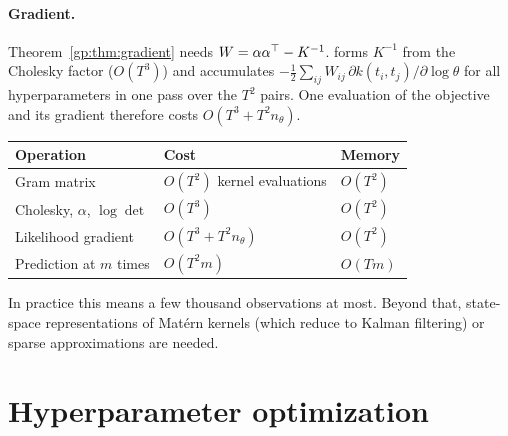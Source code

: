 \paragraph{Gradient.} Theorem~\ref{gp:thm:gradient} needs $W=\alpha\alpha^\top-K^{-1}$.
 forms $K^{-1}$ from the Cholesky factor ($O(T^3)$) and accumulates
$-\tfrac12\sum_{ij}W_{ij}\,\partial k(t_i,t_j)/\partial\log\theta$ for all
hyperparameters in one pass over the $T^2$ pairs. One evaluation of the objective
and its gradient therefore costs $O(T^3+T^2n_\theta)$.

\begin{center}
\begin{tabular}{@{}lll@{}}
\toprule
Operation & Cost & Memory \\
\midrule
Gram matrix & $O(T^2)$ kernel evaluations & $O(T^2)$ \\
Cholesky, $\alpha$, $\log\det$ & $O(T^3)$ & $O(T^2)$ \\
Likelihood gradient & $O(T^3+T^2n_\theta)$ & $O(T^2)$ \\
Prediction at $m$ times & $O(T^2m)$ & $O(Tm)$ \\
\bottomrule
\end{tabular}
\end{center}
In practice this means a few thousand observations at most. Beyond that,
state-space representations of Matérn kernels (which reduce to Kalman filtering) or sparse
approximations are needed.

\section{Hyperparameter optimization}\label{gp:sec:optimization}

